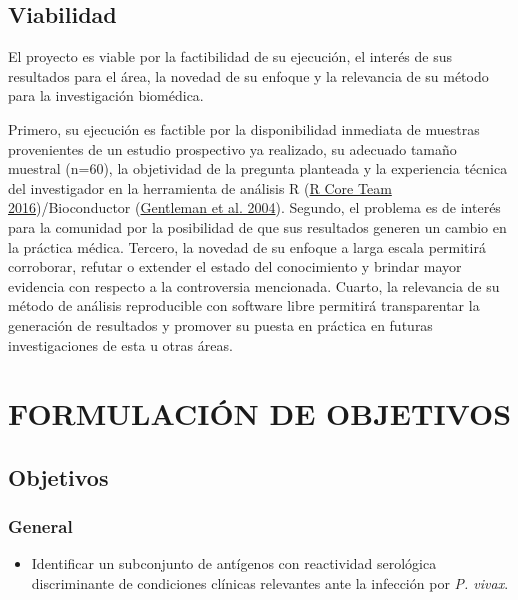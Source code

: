 \documentclass[
  a4paper]{article}
\providecommand{\tightlist}{%
  \setlength{\itemsep}{0pt}\setlength{\parskip}{0pt}}
\begin{document}
\hypertarget{viabilidad}{%
\subsection{Viabilidad}\label{viabilidad}}

El proyecto es viable por la factibilidad de su ejecución, el interés de
sus resultados para el área, la novedad de su enfoque y la relevancia de
su método para la investigación biomédica.

Primero, su ejecución es factible por la disponibilidad inmediata de
muestras provenientes de un estudio prospectivo ya realizado, su
adecuado tamaño muestral (n=60), la objetividad de la pregunta planteada
y la experiencia técnica del investigador en la herramienta de análisis
R (\protect\hyperlink{ref-R2016}{R Core Team 2016})/Bioconductor
(\protect\hyperlink{ref-bioconductor2004}{Gentleman et al. 2004}).
Segundo, el problema es de interés para la comunidad por la posibilidad
de que sus resultados generen un cambio en la práctica médica. Tercero,
la novedad de su enfoque a larga escala permitirá corroborar, refutar o
extender el estado del conocimiento y brindar mayor evidencia con
respecto a la controversia mencionada. Cuarto, la relevancia de su
método de análisis reproducible con software libre permitirá
transparentar la generación de resultados y promover su puesta en
práctica en futuras investigaciones de esta u otras áreas.

\hypertarget{formulaciuxf3n-de-objetivos}{%
\section{FORMULACIÓN DE OBJETIVOS}\label{formulaciuxf3n-de-objetivos}}

\hypertarget{objetivos}{%
\subsection{Objetivos}\label{objetivos}}

\hypertarget{general}{%
\subsubsection{General}\label{general}}

\begin{itemize}
\tightlist
\item
  Identificar un subconjunto de antígenos con reactividad serológica
  discriminante de condiciones clínicas relevantes ante la infección por
  \emph{P. vivax}.
\end{itemize}
\end{document}
